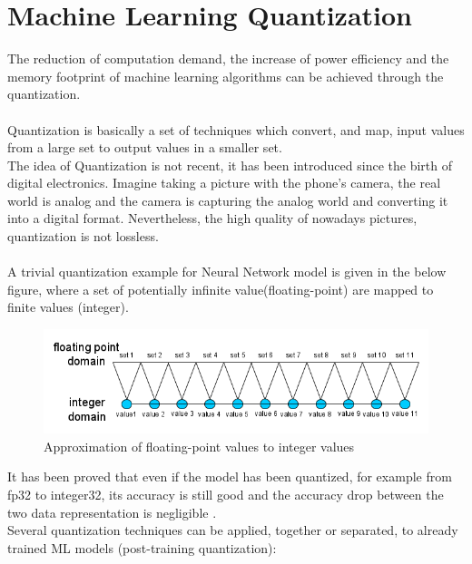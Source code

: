 \section{Machine Learning Quantization}
The reduction of computation demand, the increase of power efficiency and the memory footprint of machine learning algorithms can be achieved through the quantization.\\\\

Quantization is basically a set of techniques which convert, and map, input values from a large set to output values in a smaller set.\\The idea of Quantization is not recent, it has been introduced since the birth of digital electronics. Imagine taking a picture with the phone's camera, the real world is analog and the camera is capturing the analog world and converting it into a digital format. Nevertheless, the high quality of nowadays pictures, quantization is not lossless.\\\\
A trivial quantization example for Neural Network model is given in the below figure, where a set of potentially infinite value(floating-point) are mapped to finite values (integer).
\begin{figure}[H]
\centering
\captionsetup{justification=centering}
\includegraphics[scale=0.55]{./figure/quant.png}
\caption{Approximation of floating-point values to integer values}
\label{fig:quant}
\end{figure}
It has been proved that even if the model has been quantized, for example from fp32 to integer32, its accuracy is still good and the accuracy drop between the two data representation is negligible \cite{paper:8}.\\
Several quantization techniques can be applied, together or separated, to already trained ML models (post-training quantization):

